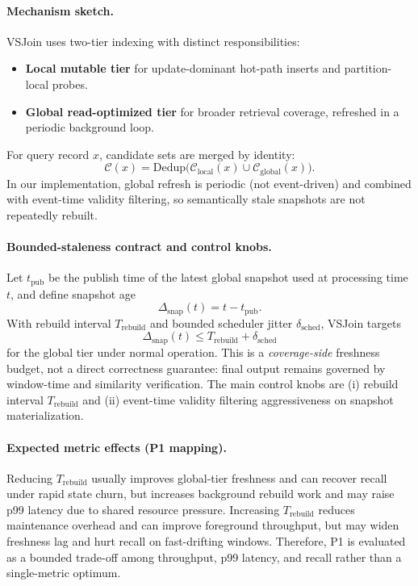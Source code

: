 \paragraph{Mechanism sketch.}
VSJoin uses two-tier indexing with distinct responsibilities:
\begin{itemize}
    \item \textbf{Local mutable tier} for update-dominant hot-path inserts and partition-local probes.
    \item \textbf{Global read-optimized tier} for broader retrieval coverage, refreshed in a periodic background loop.
\end{itemize}
For query record $x$, candidate sets are merged by identity:
\[
\mathcal{C}(x)=\mathrm{Dedup}\big(\mathcal{C}_{\text{local}}(x)\cup\mathcal{C}_{\text{global}}(x)\big).
\]
In our implementation, global refresh is periodic (not event-driven) and combined with event-time validity filtering, so semantically stale snapshots are not repeatedly rebuilt.

\paragraph{Bounded-staleness contract and control knobs.}
Let $t_{\mathrm{pub}}$ be the publish time of the latest global snapshot used at processing time $t$, and define snapshot age
\[
\Delta_{\mathrm{snap}}(t)=t-t_{\mathrm{pub}}.
\]
With rebuild interval $T_{\mathrm{rebuild}}$ and bounded scheduler jitter $\delta_{\mathrm{sched}}$, VSJoin targets
\[
\Delta_{\mathrm{snap}}(t) \le T_{\mathrm{rebuild}} + \delta_{\mathrm{sched}}
\]
for the global tier under normal operation. This is a \emph{coverage-side} freshness budget, not a direct correctness guarantee: final output remains governed by window-time and similarity verification. The main control knobs are (i) rebuild interval $T_{\mathrm{rebuild}}$ and (ii) event-time validity filtering aggressiveness on snapshot materialization.

\paragraph{Expected metric effects (P1 mapping).}
Reducing $T_{\mathrm{rebuild}}$ usually improves global-tier freshness and can recover recall under rapid state churn, but increases background rebuild work and may raise p99 latency due to shared resource pressure. Increasing $T_{\mathrm{rebuild}}$ reduces maintenance overhead and can improve foreground throughput, but may widen freshness lag and hurt recall on fast-drifting windows. Therefore, P1 is evaluated as a bounded trade-off among throughput, p99 latency, and recall rather than a single-metric optimum.

